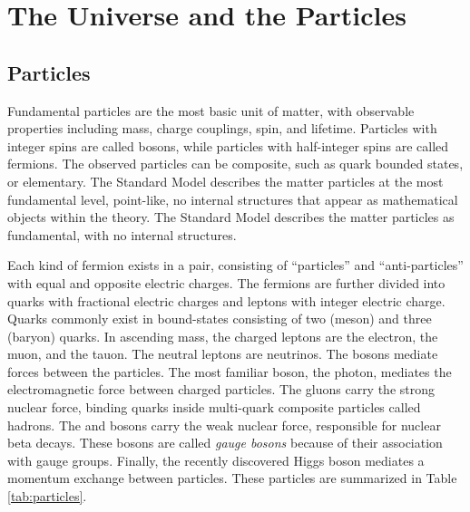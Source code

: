 \section{The Universe and the Particles}\label{sec:thyIntro}

\subsection{Particles}
Fundamental particles are the most basic unit of matter, with observable properties including mass, charge couplings, spin, and lifetime.
Particles with integer spins are called bosons, while particles with half-integer spins are called fermions.
The observed particles can be composite, such as quark bounded states, or elementary.
The Standard Model describes the matter particles at the most fundamental level, point-like, no internal structures that appear as mathematical objects within the theory.
The Standard Model describes the matter particles as fundamental, with no internal structures.

Each kind of fermion exists in a pair, consisting of ``particles'' and ``anti-particles'' with equal and opposite electric charges.
The fermions are further divided into quarks with fractional electric charges and leptons with integer electric charge.
Quarks commonly exist in bound-states consisting of two (meson) and three (baryon) quarks.
In ascending mass, the charged leptons are the electron, the muon, and the tauon.
The neutral leptons are neutrinos.
The bosons mediate forces between the particles.
The most familiar boson, the photon, mediates the electromagnetic force between charged particles.
The gluons carry the strong nuclear force, binding quarks inside multi-quark composite particles called hadrons.
The \W and \Z bosons carry the weak nuclear force, responsible for nuclear beta decays.
These bosons are called \emph{gauge bosons} because of their association with gauge groups.
Finally, the recently discovered Higgs boson mediates a momentum exchange between particles.
These particles are summarized in Table \ref{tab:particles}.

